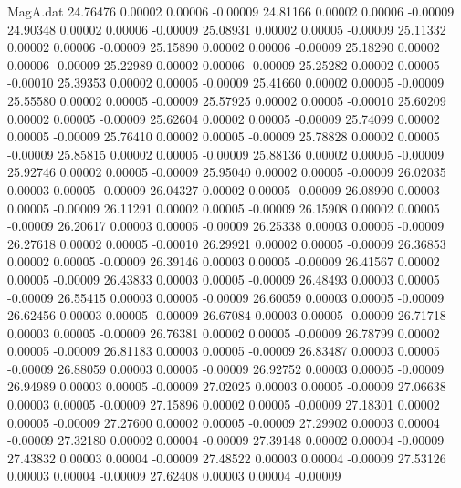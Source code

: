 \begin{filecontents}{MagA.dat}
  24.76476    0.00002    0.00006   -0.00009
  24.81166    0.00002    0.00006   -0.00009
  24.90348    0.00002    0.00006   -0.00009
  25.08931    0.00002    0.00005   -0.00009
  25.11332    0.00002    0.00006   -0.00009
  25.15890    0.00002    0.00006   -0.00009
  25.18290    0.00002    0.00006   -0.00009
  25.22989    0.00002    0.00006   -0.00009
  25.25282    0.00002    0.00005   -0.00010
  25.39353    0.00002    0.00005   -0.00009
  25.41660    0.00002    0.00005   -0.00009
  25.55580    0.00002    0.00005   -0.00009
  25.57925    0.00002    0.00005   -0.00010
  25.60209    0.00002    0.00005   -0.00009
  25.62604    0.00002    0.00005   -0.00009
  25.74099    0.00002    0.00005   -0.00009
  25.76410    0.00002    0.00005   -0.00009
  25.78828    0.00002    0.00005   -0.00009
  25.85815    0.00002    0.00005   -0.00009
  25.88136    0.00002    0.00005   -0.00009
  25.92746    0.00002    0.00005   -0.00009
  25.95040    0.00002    0.00005   -0.00009
  26.02035    0.00003    0.00005   -0.00009
  26.04327    0.00002    0.00005   -0.00009
  26.08990    0.00003    0.00005   -0.00009
  26.11291    0.00002    0.00005   -0.00009
  26.15908    0.00002    0.00005   -0.00009
  26.20617    0.00003    0.00005   -0.00009
  26.25338    0.00003    0.00005   -0.00009
  26.27618    0.00002    0.00005   -0.00010
  26.29921    0.00002    0.00005   -0.00009
  26.36853    0.00002    0.00005   -0.00009
  26.39146    0.00003    0.00005   -0.00009
  26.41567    0.00002    0.00005   -0.00009
  26.43833    0.00003    0.00005   -0.00009
  26.48493    0.00003    0.00005   -0.00009
  26.55415    0.00003    0.00005   -0.00009
  26.60059    0.00003    0.00005   -0.00009
  26.62456    0.00003    0.00005   -0.00009
  26.67084    0.00003    0.00005   -0.00009
  26.71718    0.00003    0.00005   -0.00009
  26.76381    0.00002    0.00005   -0.00009
  26.78799    0.00002    0.00005   -0.00009
  26.81183    0.00003    0.00005   -0.00009
  26.83487    0.00003    0.00005   -0.00009
  26.88059    0.00003    0.00005   -0.00009
  26.92752    0.00003    0.00005   -0.00009
  26.94989    0.00003    0.00005   -0.00009
  27.02025    0.00003    0.00005   -0.00009
  27.06638    0.00003    0.00005   -0.00009
  27.15896    0.00002    0.00005   -0.00009
  27.18301    0.00002    0.00005   -0.00009
  27.27600    0.00002    0.00005   -0.00009
  27.29902    0.00003    0.00004   -0.00009
  27.32180    0.00002    0.00004   -0.00009
  27.39148    0.00002    0.00004   -0.00009
  27.43832    0.00003    0.00004   -0.00009
  27.48522    0.00003    0.00004   -0.00009
  27.53126    0.00003    0.00004   -0.00009
  27.62408    0.00003    0.00004   -0.00009

\end{filecontents}
